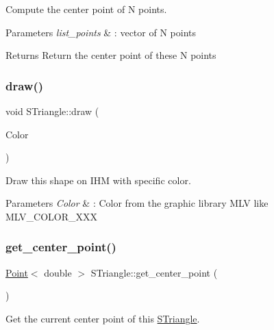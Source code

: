 Compute the center point of N points. 


\begin{DoxyParams}{Parameters}
{\em list\+\_\+points} & \+: vector of N points \\
\hline
\end{DoxyParams}
\begin{DoxyReturn}{Returns}
Return the center point of these N points 
\end{DoxyReturn}
\mbox{\label{classSTriangle_a7eddfc5b9e5b2951ba71b085345d87d1}} 
\subsubsection{\texorpdfstring{draw()}{draw()}}
{\footnotesize\ttfamily void S\+Triangle\+::draw (\begin{DoxyParamCaption}\item[{M\+L\+V\+\_\+\+Color}]{Color }\end{DoxyParamCaption})}



Draw this shape on I\+HM with specific color. 


\begin{DoxyParams}{Parameters}
{\em Color} & \+: Color from the graphic library M\+LV like M\+L\+V\+\_\+\+C\+O\+L\+O\+R\+\_\+\+X\+XX \\
\hline
\end{DoxyParams}
\mbox{\label{classSTriangle_a61228a7f80ee90de80dff8c4e046f51f}} 
\subsubsection{\texorpdfstring{get\+\_\+center\+\_\+point()}{get\_center\_point()}}
{\footnotesize\ttfamily \hyperlink{classPoint}{Point}$<$ double $>$ S\+Triangle\+::get\+\_\+center\+\_\+point (\begin{DoxyParamCaption}{ }\end{DoxyParamCaption})}



Get the current center point of this \hyperlink{classSTriangle}{S\+Triangle}. 

